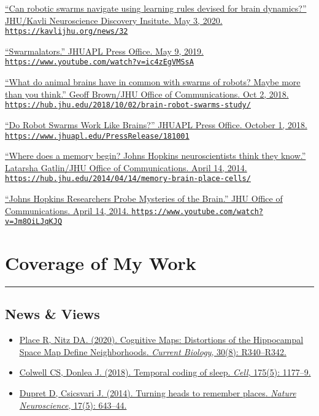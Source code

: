 \documentclass[10pt]{article}
\newcommand{\itemtitle}[1]{{\color{hopkinsblue}\ul{#1}}}
\newcommand{\aurl}[1]{{\color{dimgray}\texttt{#1}}}
\newcommand{\newsection}[2]{%
  \section*{#1}
  \vspace{-.125in}
  \hrule
  \vspace{.22in}
  \label{sec:#2}
}
\begin{document}
\begin{description}
  \item \href{https://kavlijhu.org/news/32} {``\itemtitle{Can
        robotic swarms navigate using learning rules devised for brain
      dynamics?}'' JHU/Kavli Neuroscience Discovery Insitute. May 3, 2020.
    \aurl{https://kavlijhu.org/news/32}}
  \item \href{https://www.youtube.com/watch?v=ic4zEgVMSsA}
    {``\itemtitle{Swarmalators}.'' JHUAPL Press Office. May 9, 2019.
    \aurl{https://www.youtube.com/watch?v=ic4zEgVMSsA}}
  \item \href{https://hub.jhu.edu/2018/10/02/brain-robot-swarms-study/}
    {``\itemtitle{What do animal brains have in common with swarms of robots?
      Maybe more than you think}.'' Geoff Brown/JHU Office of Communications. Oct 2,
    2018. \aurl{https://hub.jhu.edu/2018/10/02/brain-robot-swarms-study/}}
  \item \href{https://www.jhuapl.edu/PressRelease/181001}
    {``\itemtitle{Do Robot Swarms Work Like Brains?}'' JHUAPL Press Office. October 1, 2018.
    \aurl{https://www.jhuapl.edu/PressRelease/181001}}
  \item \href{https://hub.jhu.edu/2014/04/14/memory-brain-place-cells/}
    {``\itemtitle{Where does a memory begin? Johns Hopkins neuroscientists think they
      know}.'' Latarsha Gatlin/JHU Office of Communications. April 14, 2014.
    \aurl{https://hub.jhu.edu/2014/04/14/memory-brain-place-cells/}}
  \item \href{https://www.youtube.com/watch?v=Jm8OiLJqKJQ}
    {``\itemtitle{Johns Hopkins Researchers Probe Mysteries of
      the Brain}.'' JHU Office of Communications. April 14, 2014.
    \aurl{https://www.youtube.com/watch?v=Jm8OiLJqKJQ}}
\end{description}

\newsection{Coverage of My Work}{press}

\subsection*{News \& Views}

\begin{itemize}
  \item \href{https://dx.doi.org/10.1016/j.cub.2020.02.085}
    {Place R, Nitz DA. (2020). \itemtitle{Cognitive Maps: Distortions of the Hippocampal 
    Space Map Define Neighborhoods}. \emph{Current Biology}, 30(8): R340--R342.}
  \item \href{https://dx.doi.org/10.1016/j.cell.2018.10.047}
    {Colwell CS, Donlea J. (2018). \itemtitle{Temporal coding of sleep}. \emph{Cell}, 175(5): 1177--9.}
  \item \href{https://dx.doi.org/10.1038/nn.3700}
    {Dupret D, Csicsvari J. (2014). \itemtitle{Turning heads to remember
    places}. \emph{Nature Neuroscience}, 17(5): 643--44.}
\end{itemize}
\end{document}
